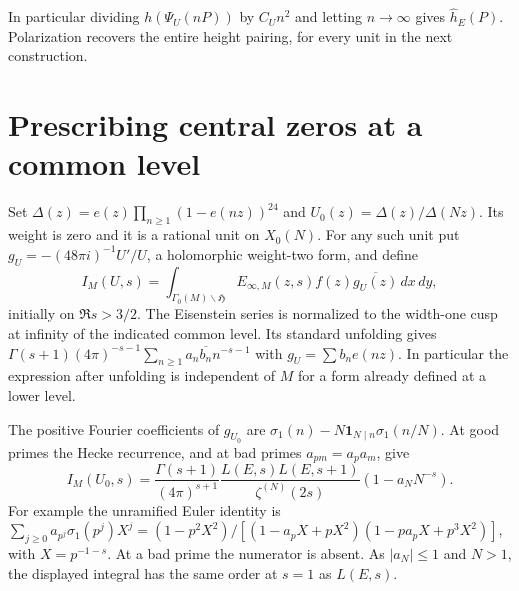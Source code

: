 \documentclass[11pt]{article}
\begin{document}
In particular dividing $h(\Psi_U(nP))$ by $C_U n^2$ and letting $n\to\infty$ gives $\widehat h_E(P)$. Polarization recovers the entire height pairing, for every unit in the next construction.

\section{Prescribing central zeros at a common level}
Set $\Delta(z)=e(z)\prod_{n\ge1}(1-e(nz))^{24}$ and
$U_0(z)=\Delta(z)/\Delta(Nz)$. Its weight is zero and it is a rational unit on $X_0(N)$. For any such unit put $g_U=-(48\pi i)^{-1}U'/U$, a holomorphic weight-two form, and define
\[
 I_M(U,s)=\int_{\Gamma_0(M)\backslash\mathfrak H}
 E_{\infty,M}(z,s) f(z)\overline{g_U(z)}\,dx\,dy ,
\]
initially on $\Re s>3/2$. The Eisenstein series is normalized to the width-one cusp at infinity of the indicated common level. Its standard unfolding gives $\Gamma(s+1)(4\pi)^{-s-1}\sum_{n\ge1}a_n\overline{b_n}n^{-s-1}$ with $g_U=\sum b_n e(nz)$. In particular the expression after unfolding is independent of $M$ for a form already defined at a lower level.

The positive Fourier coefficients of $g_{U_0}$ are $\sigma_1(n)-N\mathbf1_{N\mid n}\sigma_1(n/N)$. At good primes the Hecke recurrence, and at bad primes $a_{pm}=a_pa_m$, give
\[
 I_M(U_0,s)=
 \frac{\Gamma(s+1)}{(4\pi)^{s+1}}
 \frac{L(E,s)L(E,s+1)}{\zeta^{(N)}(2s)}(1-a_NN^{-s}).
\]
For example the unramified Euler identity is
$\sum_{j\ge0}a_{p^j}\sigma_1(p^j)X^j=(1-p^2X^2)/
[(1-a_pX+pX^2)(1-pa_pX+p^3X^2)]$, with $X=p^{-1-s}$. At a bad prime the numerator is absent. As $|a_N|\le1$ and $N>1$, the displayed integral has the same order at $s=1$ as $L(E,s)$.
\end{document}
